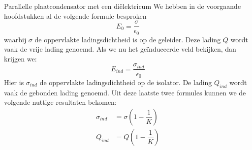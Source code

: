 \begin{app}{Parallelle plaatcondensator met een diëlektricum}
    We hebben in de voorgaande hoofdstukken al de volgende formule besproken
    \begin{equation*}
        E_0 = \dfrac{\sigma}{\epsilon_0}
    \end{equation*}
    waarbij $\sigma$ de oppervlakte ladingsdichtheid is op de geleider. Deze lading $Q$ wordt vaak de vrije lading genoemd.
    Als we nu het geïnduceerde veld bekijken, dan krijgen we:
    \begin{equation*}
        E_{ind} = \dfrac{\sigma_{ind}}{\epsilon_0}
    \end{equation*}
    Hier is $\sigma_{ind}$ de oppervlakte ladingsdichtheid op de isolator. De lading $Q_{ind}$ wordt vaak de gebonden lading genoemd. Uit deze laatste twee formules kunnen we de volgende nuttige resultaten bekomen:
    \begin{align*}
            \sigma_{ind} &= \sigma\left(1-\dfrac{1}{K}\right) \\
            Q_{ind} &= Q\left(1-\dfrac{1}{K}\right)
    \end{align*}
\end{app}



